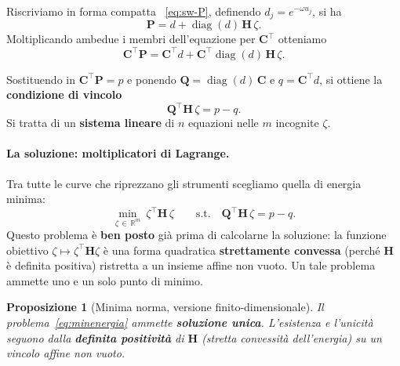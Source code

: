 \documentclass[11pt,a4paper]{article}
\theoremstyle{plain}
\newtheorem{proposizione}[teorema]{Proposizione}
\theoremstyle{definition}
\theoremstyle{remark}
\newcommand{\Qmat}{\mathbf{Q}}
\newcommand{\Hmat}{\mathbf{H}}
\newcommand{\transp}{^{\!\top}}
\begin{document}
Riscriviamo in forma compatta ~\eqref{eq:sw-P}, definendo $d_j = e^{-\omega u_j}$, si ha
\[
  \mathbf{P} = d + \operatorname{diag}(d)\,\Hmat\,\zeta .
\]
Moltiplicando ambedue i membri dell'equazione per $\mathbf{C}\transp$ otteniamo
\[
  \mathbf{C}\transp \mathbf{P} = \mathbf{C}\transp d + \mathbf{C}\transp \operatorname{diag}(d)\,\Hmat\,\zeta .
\]

Sostituendo in $\mathbf{C}\transp \mathbf{P} = p$ e ponendo
$\Qmat = \operatorname{diag}(d)\,\mathbf{C}$ e $q = \mathbf{C}\transp d$, si ottiene la
\textbf{condizione di vincolo}
\begin{equation}
  \Qmat\transp \Hmat\, \zeta = p - q .
  \label{eq:vincolo}
\end{equation}
Si tratta di un \textbf{sistema lineare} di $n$ equazioni nelle $m$ incognite $\zeta$.%

\paragraph{La soluzione: moltiplicatori di Lagrange.}
Tra tutte le curve che riprezzano gli strumenti scegliamo quella di energia minima:
\begin{equation}
  \min_{\zeta\,\in\,\mathbb{R}^m} \ \zeta\transp \Hmat\, \zeta
  \qquad \text{s.t.}\quad
  \Qmat\transp \Hmat\, \zeta = p - q .
  \label{eq:minenergia}
\end{equation}
Questo problema \`e \textbf{ben posto} gi\`a prima di calcolarne la soluzione: la funzione
obiettivo $\zeta\mapsto\zeta\transp\Hmat\zeta$ \`e una forma quadratica
\textbf{strettamente convessa} (perch\'e $\Hmat$ \`e definita positiva) ristretta a un
insieme affine non vuoto. Un tale problema ammette uno e un solo punto di minimo.

\begin{proposizione}[Minima norma, versione finito-dimensionale]
\label{prop:minnorm-finita}
Il problema~\eqref{eq:minenergia} ammette \textbf{soluzione unica}. L'esistenza e
l'unicit\`a seguono dalla \textbf{definita positivit\`a} di $\Hmat$ (stretta
convessit\`a dell'energia) su un vincolo affine non vuoto.
\end{proposizione}
\end{document}
